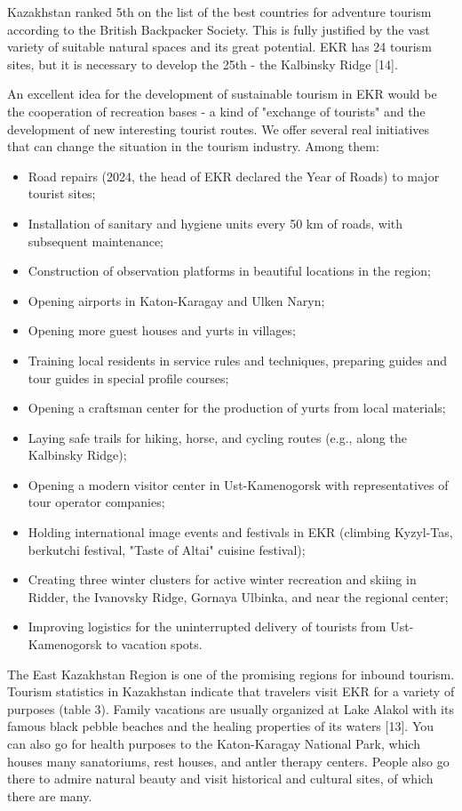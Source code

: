 Kazakhstan ranked 5th on the list of the best countries for adventure
tourism according to the British Backpacker Society. This is fully
justified by the vast variety of suitable natural spaces and its great
potential. EKR has 24 tourism sites, but it is necessary to develop the
25th - the Kalbinsky Ridge {[}14{]}.

An excellent idea for the development of sustainable tourism in EKR
would be the cooperation of recreation bases - a kind of "exchange of
tourists" and the development of new interesting tourist routes. We
offer several real initiatives that can change the situation in the
tourism industry. Among them:

\begin{itemize}
\item
  Road repairs (2024, the head of EKR declared the Year of Roads) to
  major tourist sites;
\item
  Installation of sanitary and hygiene units every 50 km of roads, with
  subsequent maintenance;
\item
  Construction of observation platforms in beautiful locations in the
  region;
\item
  Opening airports in Katon-Karagay and Ulken Naryn;
\item
  Opening more guest houses and yurts in villages;
\item
  Training local residents in service rules and techniques, preparing
  guides and tour guides in special profile courses;
\item
  Opening a craftsman center for the production of yurts from local
  materials;
\item
  Laying safe trails for hiking, horse, and cycling routes (e.g., along
  the Kalbinsky Ridge);
\item
  Opening a modern visitor center in Ust-Kamenogorsk with
  representatives of tour operator companies;
\item
  Holding international image events and festivals in EKR (climbing
  Kyzyl-Tas, berkutchi festival, "Taste of Altai" cuisine festival);
\item
  Creating three winter clusters for active winter recreation and skiing
  in Ridder, the Ivanovsky Ridge, Gornaya Ulbinka, and near the regional
  center;
\item
  Improving logistics for the uninterrupted delivery of tourists from
  Ust-Kamenogorsk to vacation spots.
\end{itemize}

The East Kazakhstan Region is one of the promising regions for inbound
tourism. Tourism statistics in Kazakhstan indicate that travelers visit
EKR for a variety of purposes (table 3). Family vacations are usually
organized at Lake Alakol with its famous black pebble beaches and the
healing properties of its waters {[}13{]}. You can also go for health
purposes to the Katon-Karagay National Park, which houses many
sanatoriums, rest houses, and antler therapy centers. People also go
there to admire natural beauty and visit historical and cultural sites,
of which there are many.

